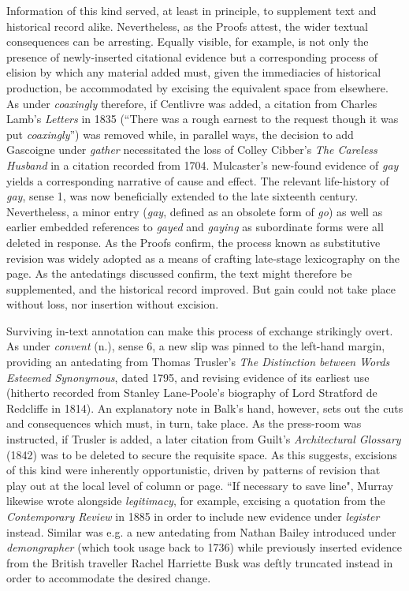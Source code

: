 \documentclass[output=paper,colorlinks,citecolor=brown,arabicfont,chinesefont]{langscibook}
\begin{document}
Information of this kind served, at least in principle, to supplement text and historical record alike. Nevertheless, as the Proofs attest, the wider textual consequences can be arresting. Equally visible, for example, is not only the presence of newly-inserted citational evidence but a corresponding process of elision by which any material added must, given the immediacies of historical production, be accommodated by excising the equivalent space from elsewhere. As under \emph{coaxingly} therefore, if Centlivre was added, a citation from Charles Lamb’s \emph{Letters} in 1835 (“There was a rough earnest to the request though it was put \emph{coaxingly}”) was removed while, in parallel ways, the decision to add Gascoigne under \emph{gather} necessitated the loss of Colley Cibber’s \emph{The Careless Husband} in a citation recorded from 1704. Mulcaster’s new-found evidence of \emph{gay} yields a corresponding narrative of cause and effect. The relevant life-history of \emph{gay}, sense 1, was now beneficially extended to the late sixteenth century. Nevertheless, a minor entry (\emph{gay}, defined as an obsolete form of \emph{go}) as well as earlier embedded references to \emph{gayed} and \emph{gaying} as subordinate forms were all deleted in response. As the Proofs confirm, the process known as substitutive revision was widely adopted as a means of crafting late-stage lexicography on the page. As the antedatings discussed confirm, the text might therefore be supplemented, and the historical record improved. But gain could not take place without loss, nor insertion without excision.

Surviving in-text annotation can make this process of exchange strikingly overt. As under \emph{convent} (n.), sense 6, a new slip was pinned to the left-hand margin, providing an antedating from Thomas Trusler’s \emph{The Distinction between Words Esteemed Synonymous}, dated 1795, and revising evidence of its earliest use (hitherto recorded from Stanley Lane-Poole’s biography of Lord Stratford de Redcliffe in 1814). An explanatory note in Balk’s hand, however, sets out the cuts and consequences which must, in turn, take place. As the press-room was instructed, if Trusler is added, a later citation from Guilt’s \emph{Architectural Glossary} (1842) was to be deleted to secure the requisite space.  As this suggests, excisions of this kind were inherently opportunistic, driven by patterns of revision that play out at the local level of column or page. “If necessary to save line", Murray likewise wrote alongside \emph{legitimacy}, for example, excising a quotation from the \emph{Contemporary Review} in 1885 in order to include new evidence under \emph{legister} instead. Similar was e.g. a new antedating from Nathan Bailey introduced under \emph{demongrapher} (which took usage back to 1736) while previously inserted evidence from the British traveller Rachel Harriette Busk was deftly truncated instead in order to accommodate the desired change. 
\end{document}
